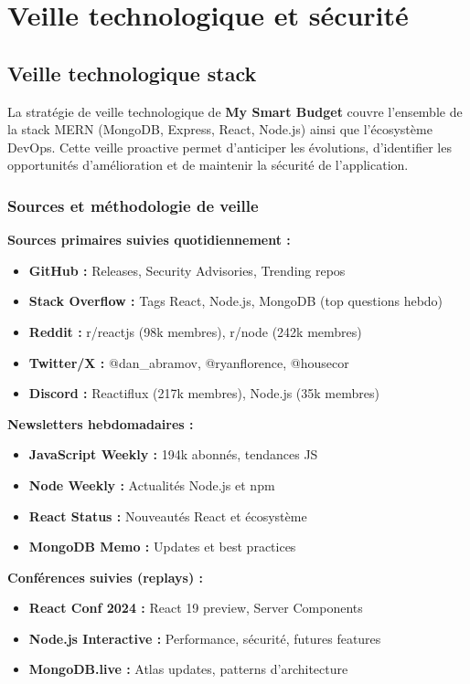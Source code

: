 \chapter{Veille technologique et sécurité}

\section{Veille technologique stack}

La stratégie de veille technologique de \textbf{My Smart Budget} couvre l'ensemble de la stack MERN (MongoDB, Express, React, Node.js) ainsi que l'écosystème DevOps. Cette veille proactive permet d'anticiper les évolutions, d'identifier les opportunités d'amélioration et de maintenir la sécurité de l'application.

\subsection{Sources et méthodologie de veille}

\begin{tcolorbox}[colback=blue!5!white,colframe=blue!60!black,title=\textbf{Écosystème de veille technologique}]
\textbf{Sources primaires suivies quotidiennement :}
\begin{itemize}
    \item \textbf{GitHub :} Releases, Security Advisories, Trending repos
    \item \textbf{Stack Overflow :} Tags React, Node.js, MongoDB (top questions hebdo)
    \item \textbf{Reddit :} r/reactjs (98k membres), r/node (242k membres)
    \item \textbf{Twitter/X :} @dan\_abramov, @ryanflorence, @housecor
    \item \textbf{Discord :} Reactiflux (217k membres), Node.js (35k membres)
\end{itemize}

\textbf{Newsletters hebdomadaires :}
\begin{itemize}
    \item \textbf{JavaScript Weekly :} 194k abonnés, tendances JS
    \item \textbf{Node Weekly :} Actualités Node.js et npm
    \item \textbf{React Status :} Nouveautés React et écosystème
    \item \textbf{MongoDB Memo :} Updates et best practices
\end{itemize}

\textbf{Conférences suivies (replays) :}
\begin{itemize}
    \item \textbf{React Conf 2024 :} React 19 preview, Server Components
    \item \textbf{Node.js Interactive :} Performance, sécurité, futures features
    \item \textbf{MongoDB.live :} Atlas updates, patterns d'architecture
\end{itemize}
\end{tcolorbox}

